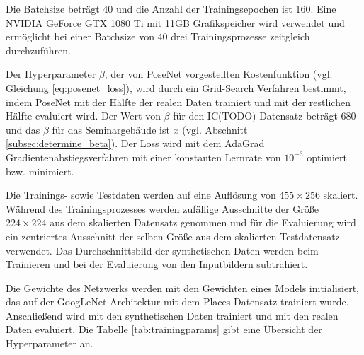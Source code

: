 Die Batchsize beträgt 40 und die Anzahl der Trainingsepochen ist 160. Eine NVIDIA GeForce GTX 1080 Ti mit 11GB Grafikspeicher wird verwendet und ermöglicht bei einer Batchsize von 40 drei Trainingsprozesse zeitgleich durchzuführen.

Der Hyperparameter $\beta$, der von PoseNet vorgestellten Kostenfunktion (vgl. Gleichung \ref{eq:posenet_loss}), wird durch ein Grid-Search Verfahren bestimmt, indem PoseNet mit der Hälfte der realen Daten trainiert und mit der restlichen Hälfte evaluiert wird. Der Wert von $\beta$ für den IC(TODO)-Datensatz beträgt 680 und das $\beta$ für das Seminargebäude ist $x$ (vgl. Abschnitt \ref{subsec:determine_beta}). Der Loss wird mit dem AdaGrad \cite{duchiAdaptiveSubgradientMethods2011} Gradientenabstiegsverfahren mit einer konstanten Lernrate von $10^{-3}$ optimiert bzw. minimiert. 

Die Trainings- sowie Testdaten werden auf eine Auflösung von $455\times256$ skaliert. Während des Trainingsprozesses werden zufällige Ausschnitte der Größe $224 \times 224$ aus dem skalierten Datensatz genommen und für die Evaluierung wird ein zentriertes Ausschnitt der selben Größe aus dem skalierten Testdatensatz verwendet. Das Durchschnittsbild der synthetischen Daten werden beim Trainieren und bei der Evaluierung von den Inputbildern subtrahiert.

Die Gewichte des Netzwerks werden mit den Gewichten eines Models initialisiert, das auf der GoogLeNet Architektur mit dem Places Datensatz \cite{zhouLearningDeepFeatures2014} trainiert wurde. Anschließend wird mit den synthetischen Daten trainiert und mit den realen Daten evaluiert. Die Tabelle \ref{tab:trainingparams} gibt eine Übersicht der Hyperparameter an.

